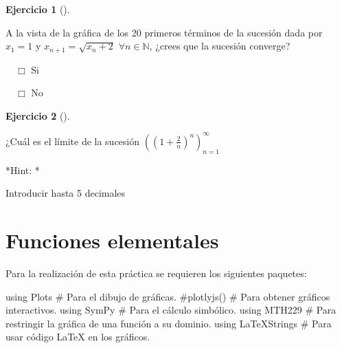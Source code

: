\documentclass[
  a4paper,
]{scrreport}
\newenvironment{Shaded}{\begin{snugshade}}{\end{snugshade}}
\newcommand{\BuiltInTok}[1]{\textcolor[rgb]{0.00,0.23,0.31}{#1}}
\newcommand{\CommentTok}[1]{\textcolor[rgb]{0.37,0.37,0.37}{#1}}
\newcommand{\ImportTok}[1]{\textcolor[rgb]{0.00,0.46,0.62}{#1}}
\theoremstyle{definition}
\newtheorem{exercise}{Ejercicio}[chapter]
\theoremstyle{remark}
\begin{document}
\leavevmode{}%
\begin{exercise}[]\label{exr-sucesiones-propuesto-6}

A la vista de la gráfica de los 20 primeros términos de la sucesión dada
por \(x_1=1\) y \(x_{n+1}=\sqrt{x_n+2}\) \(\forall n\in \mathbb{N}\),
¿crees que la sucesión converge?

${\quad\Box}$ Si

${\quad\Box}$ No

\end{exercise}

\leavevmode{}%
\begin{exercise}[]\label{exr-sucesiones-propuesto-7}

¿Cuál es el límite de la sucesión
\(\left(\left(1+\frac{2}{n}\right)^n\right)_{n=1}^\infty\)

\vspace{18pt}*Hint: *

Introducir hasta 5 decimales

\end{exercise}


\hypertarget{funciones-elementales}{%
\chapter{Funciones elementales}\label{funciones-elementales}}

Para la realización de esta práctica se requieren los siguientes
paquetes:

\begin{Shaded}
\begin{Highlighting}[]
\ImportTok{using} \BuiltInTok{Plots  }\CommentTok{\# Para el dibujo de gráficas.}
\CommentTok{\#plotlyjs()  \# Para obtener gráficos interactivos.}
\ImportTok{using} \BuiltInTok{SymPy }\CommentTok{\# Para el cálculo simbólico.}
\ImportTok{using} \BuiltInTok{MTH229 }\CommentTok{\# Para restringir la gráfica de una función a su dominio.}
\ImportTok{using} \BuiltInTok{LaTeXStrings  }\CommentTok{\# Para usar código LaTeX en los gráficos.}
\end{Highlighting}
\end{Shaded}
\end{document}
